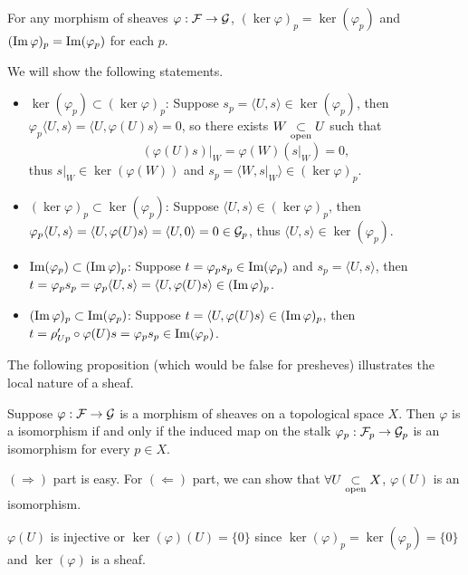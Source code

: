 \documentclass[10pt]{extbook}
\begin{document}
\pro  \label{pro:5} For any morphism of sheaves $\varphi:\mathcal{F}\to\mathcal{G}$, 
$(\ker \varphi)_p=\ker(\varphi_p)$ and $(\operatorname{Im} \varphi)_p=\operatorname{Im}(\varphi_p)$ for each $p$.

\proof We will show the following statements.
	\begin{itemize}
		\item $\ker(\varphi_p)\subset (\ker \varphi)_p$: Suppose 
			$s_p=\langle U,s\rangle\in \ker(\varphi_p)$, then 
			$\varphi_p\langle U,s\rangle=\langle U,\varphi(U)s\rangle=0$, so there 
			exists $W\underset{\mathrm{open}}{\subset} U$ such that 
		\[
			(\varphi(U)s)|_W=\varphi(W)(s|_W)=0,
		\]
		thus $s|_W\in \ker(\varphi(W))$ and $s_p=\langle W,s|_W\rangle\in (\ker \varphi)_p$.

		\item $(\ker \varphi)_p\subset\ker(\varphi_p)$: Suppose $\langle U,s\rangle\in (\ker \varphi)_p$, then $\varphi_p\langle U,s\rangle=\langle U,\varphi(U)s\rangle=\langle U,0\rangle=0\in \mathcal{G}_p$, thus $\langle U,s\rangle\in \ker(\varphi_p)$.

		\item $\operatorname{Im}(\varphi_p)\subset (\operatorname{Im} \varphi)_p$: Suppose $t=\varphi_ps_p\in\operatorname{Im} (\varphi_p)$ and $s_p=\langle U,s\rangle$, then $t=\varphi_ps_p=\varphi_p\langle U,s\rangle=\langle U,\varphi(U)s\rangle\in (\operatorname{Im} \varphi)_p$.

		\item $(\operatorname{Im} \varphi)_p\subset \operatorname{Im}(\varphi_p)$: Suppose $t=\langle U,\varphi(U)s\rangle\in (\operatorname{Im} \varphi)_p$, then $t=\rho'_{Up}\circ\varphi(U)s=\varphi_p s_p \in \operatorname{Im}(\varphi_p)$.
	\end{itemize}

The following proposition (which would be false for presheves) illustrates the local
nature of a sheaf.

\pro \label{pro:1}Suppose $\varphi:\mathcal{F}\to\mathcal{G}$ is a morphism of sheaves on a 
topological space $X$. Then $\varphi$ is a isomorphism if and only if the induced map 
on the stalk $\varphi_p:\mathcal{F}_p\to \mathcal{G}_p$ is an isomorphism for every $p\in X$.

\proof $(\Rightarrow)$ part is easy. For $(\Leftarrow)$ part, we can show that 
$\forall U\underset{\mathrm{open}}{\subset} X$, $\varphi(U)$ is an isomorphism.

$\varphi(U)$ is injective or $\ker(\varphi)(U)=\{0\}$ since 
$\ker(\varphi)_p=\ker(\varphi_p)=\{0\}$ and $\ker(\varphi)$ is a sheaf.
\end{document}
